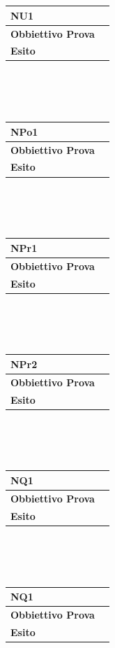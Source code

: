 \documentclass[11pt,titlepage,a4paper]{report}
\begin{document}
\\
\\
\begin{tabular}{||p{4.5cm}||p{7.5cm}||}
\hline
\textbf{\textsf{NU1}} \\
\hline
{\textbf {Obbiettivo Prova}}& \\ \hline
{\textbf{Esito}}&  \\ \hline
\end{tabular} \\
\\
\\
\begin{tabular}{||p{4.5cm}||p{7.5cm}||}
\hline
\textbf{\textsf{NPo1}} \\
\hline
{\textbf {Obbiettivo Prova}}& \\ \hline
{\textbf{Esito}}&  \\ \hline
\end{tabular} \\
\\
\\
\begin{tabular}{||p{4.5cm}||p{7.5cm}||}
\hline
\textbf{\textsf{NPr1}}& \\
\hline
{\textbf {Obbiettivo Prova}}& \\ \hline
{\textbf{Esito}}&  \\ \hline
\end{tabular} \\
\\
\\
\begin{tabular}{||p{4.5cm}||p{7.5cm}||}
\hline
\textbf{\textsf{NPr2}}& \\
\hline
{\textbf {Obbiettivo Prova}}& \\ \hline
{\textbf{Esito}}&  \\ \hline
\end{tabular} \\
\\
\\
\begin{tabular}{||p{4.5cm}||p{7.5cm}||}
\hline
\textbf{\textsf{NQ1}}& \\
\hline
{\textbf {Obbiettivo Prova}}& \\ \hline
{\textbf{Esito}}&  \\ \hline
\end{tabular} \\
\\
\\
\begin{tabular}{||p{4.5cm}||p{7.5cm}||}
\hline
\textbf{\textsf{NQ1}}& \\
\hline
{\textbf {Obbiettivo Prova}}& \\ \hline
{\textbf{Esito}}&  \\ \hline
\end{tabular} \\
\end{document}

